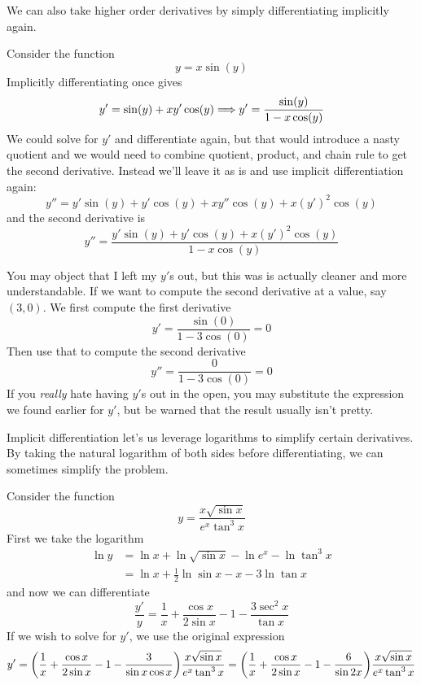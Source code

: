 We can also take higher order derivatives by simply differentiating implicitly again.

\begin{example}	
	Consider the function
	\[ y = x \sin(y) \]
	Implicitly differentiating once gives
	\[ y' = \sin(y) + xy' \cos(y) \Longrightarrow y' = \frac{\sin(y)}{1 - x \cos(y)}\]
	We could solve for $y'$ and differentiate again, but that would introduce a nasty quotient and we would need to combine quotient, product, and chain rule to get the second derivative. Instead we'll leave it as is and use implicit differentiation again:
	\[ y'' = y' \sin(y) + y' \cos(y) + x y'' \cos(y) + x (y')^2 \cos(y) \]
	and the second derivative is
	\[ y'' = \frac{y'\sin(y) + y'\cos(y) + x(y')^2 \cos(y)}{1 - x \cos(y)} \]
	
	You may object that I left my $y'$s out, but this was is actually cleaner and more understandable. If we want to compute the second derivative at a value, say $(3, 0)$. We first compute the first derivative
	\[ y' = \frac{\sin(0)}{1 - 3\cos(0)} = 0 \]
	Then use that to compute the second derivative
	\[ y'' = \frac{0}{1 - 3 \cos(0)} = 0 \]
	If you \emph{really} hate having $y'$s out in the open, you may substitute the expression we found earlier for $y'$, but be warned that the result usually isn't pretty. 
\end{example}

Implicit differentiation let's us leverage logarithms to simplify certain derivatives. By taking the natural logarithm of both sides before differentiating, we can sometimes simplify the problem.

\begin{example}
	Consider the function
	\[ y = \frac{x \sqrt{\sin x}}{e^x \tan^3 x} \]
	First we take the logarithm
	\begin{align*}
		\ln y &= \ln x + \ln \sqrt{\sin x} - \ln e^x - \ln \tan^3 x \\
		&= \ln x + \frac{1}{2} \ln \sin x - x - 3 \ln \tan x
	\end{align*}
	and now we can differentiate
	\[ \frac{y'}{y} = \frac{1}{x} + \frac{\cos x}{2 \sin x} - 1 - \frac{3 \sec^2 x}{\tan x} \]
	If we wish to solve for $y'$, we use the original expression
	\[ y' = \qty( \frac{1}{x} + \frac{\cos x}{2 \sin x} - 1 - \frac{3}{\sin x \cos x} ) \frac{x \sqrt{\sin x}}{e^x \tan^3 x} =  \qty( \frac{1}{x} + \frac{\cos x}{2 \sin x} - 1 - \frac{6}{\sin 2x} ) \frac{x \sqrt{\sin x}}{e^x \tan^3 x} \]
\end{example}